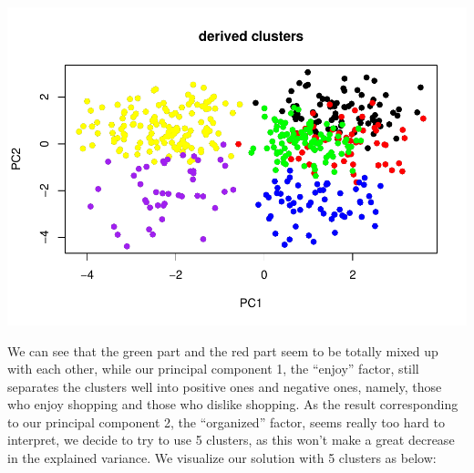 \documentclass[
  11pt,
]{article}
\newenvironment{Shaded}{\begin{snugshade}}{\end{snugshade}}
\newcommand{\AttributeTok}[1]{\textcolor[rgb]{0.77,0.63,0.00}{#1}}
\newcommand{\CommentTok}[1]{\textcolor[rgb]{0.56,0.35,0.01}{\textit{#1}}}
\newcommand{\DecValTok}[1]{\textcolor[rgb]{0.00,0.00,0.81}{#1}}
\newcommand{\FunctionTok}[1]{\textcolor[rgb]{0.00,0.00,0.00}{#1}}
\newcommand{\NormalTok}[1]{#1}
\newcommand{\SpecialCharTok}[1]{\textcolor[rgb]{0.00,0.00,0.00}{#1}}
\newcommand{\StringTok}[1]{\textcolor[rgb]{0.31,0.60,0.02}{#1}}
\begin{document}
\includegraphics{report_files/figure-latex/Task_3_89-1.pdf}

We can see that the green part and the red part seem to be totally mixed up with each other, while our principal component 1, the ``enjoy'' factor, still separates the clusters well into positive ones and negative ones, namely, those who enjoy shopping and those who dislike shopping. As the result corresponding to our principal component 2, the ``organized'' factor, seems really too hard to interpret, we decide to try to use 5 clusters, as this won't make a great decrease in the explained variance.
We visualize our solution with 5 clusters as below:

\begin{Shaded}
\end{Shaded}
\end{document}
